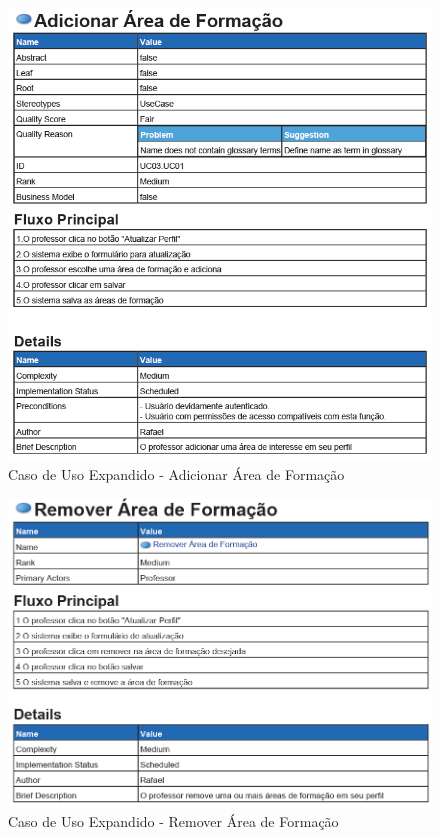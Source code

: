 \documentclass{abnt}
\begin{document}
\begin{figure}[h]
			\begin{center}
				 \includegraphics[width=450px]{casoUsoAdionarAreaFormacao}
				 \caption{Caso de Uso Expandido - Adicionar Área de Formação}
			\end{center}
		\end{figure}
		
\begin{figure}[h]
			\begin{center}
				 \includegraphics[width=450px]{casoUsoRemoverAreaFormacao}
				 \caption{Caso de Uso Expandido - Remover Área de Formação}
			\end{center}
		\end{figure}
		
\end{document}
